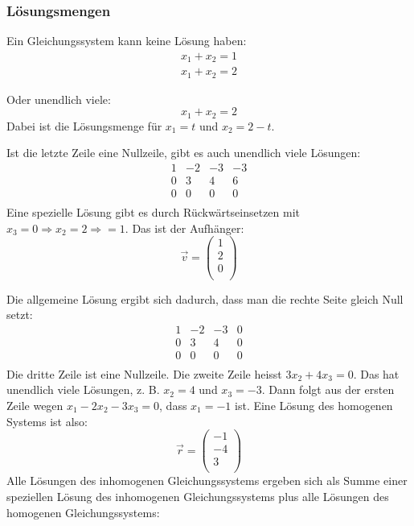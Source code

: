 \subsubsection{Lösungsmengen}

Ein Gleichungssystem kann keine Lösung haben:
\begin{align}
  x_1 + x_2 = 1 \\
  x_1 + x_2 = 2
\end{align}

Oder unendlich viele:
\[ x_1 + x_2 = 2 \] Dabei ist die Lösungsmenge für $x_1 = t$ und $x_2 =
2 - t$.

Ist die letzte Zeile eine Nullzeile, gibt es auch unendlich viele
Lösungen:
\[ \begin{array}{rrrr}
1  &   -2     & -3     & -3   \\
0   &   3     & 4     & 6   \\
0   &   0     & 0     & 0   \\
\end {array} \]
Eine spezielle Lösung gibt es durch Rückwärtseinsetzen mit $x_3 = 0
\Rightarrow x_2 = 2 \Rightarrow = 1$. Das ist der Aufhänger:
\[ \vec v = \left( \begin {array} {c} 1 \\ 2 \\ 0 \\ \end {array} \right) \]

Die allgemeine Lösung ergibt sich dadurch, dass man die rechte Seite
gleich Null setzt:
\[ \begin{array}{rrrr}
1  &   -2     & -3     & 0 \\
0   &   3     & 4     & 0 \\
0   &   0     & 0     & 0 \\
\end {array} \]
Die dritte Zeile ist eine Nullzeile. Die zweite Zeile heisst $3x_2 +
4x_3 = 0$. Das hat unendlich viele Lösungen, z. B. $x_2 = 4$ und $x_3 =
-3$. Dann folgt aus der ersten Zeile wegen $x_1 - 2x_2 - 3x_3 = 0$, dass
$x_1 = -1$ ist. Eine Lösung des homogenen Systems ist also:
\[ \vec r = \left( \begin {array} {c} -1 \\ -4 \\ 3 \\ \end {array} \right) \]
Alle Lösungen des inhomogenen Gleichungssystems ergeben sich als Summe
einer speziellen Lösung des inhomogenen Gleichungssystems plus alle
Lösungen des homogenen Gleichungssystems:

